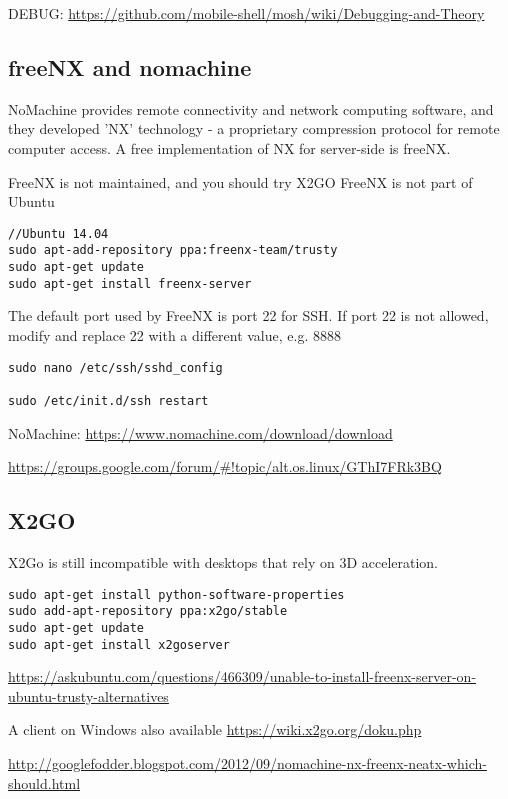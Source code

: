 DEBUG: \url{https://github.com/mobile-shell/mosh/wiki/Debugging-and-Theory}

\subsection{freeNX and nomachine}
\label{sec:freeNX}
\label{sec:nomachine}

NoMachine provides remote connectivity and network computing software, and they
developed 'NX' technology - a proprietary compression protocol for remote
computer access. A free implementation of NX for server-side is freeNX.
 
FreeNX is not maintained, and you should try X2GO 
FreeNX is not part of Ubuntu
\begin{verbatim}
//Ubuntu 14.04
sudo apt-add-repository ppa:freenx-team/trusty
sudo apt-get update
sudo apt-get install freenx-server
\end{verbatim} 
The default port used by FreeNX is port 22 for SSH. If port 22 is not allowed,
modify and replace 22 with a different value, e.g. 8888
\begin{verbatim}
sudo nano /etc/ssh/sshd_config

sudo /etc/init.d/ssh restart
\end{verbatim}

NoMachine:
\url{https://www.nomachine.com/download/download}

\url{https://groups.google.com/forum/#!topic/alt.os.linux/GThI7FRk3BQ}



\subsection{X2GO}
\label{sec:X2GO}

X2Go is still incompatible with desktops that rely on 3D acceleration.
 
\begin{verbatim}
sudo apt-get install python-software-properties
sudo add-apt-repository ppa:x2go/stable
sudo apt-get update
sudo apt-get install x2goserver
\end{verbatim}
\url{https://askubuntu.com/questions/466309/unable-to-install-freenx-server-on-ubuntu-trusty-alternatives}

A client on Windows also available
\url{https://wiki.x2go.org/doku.php}

\url{http://googlefodder.blogspot.com/2012/09/nomachine-nx-freenx-neatx-which-should.html}


